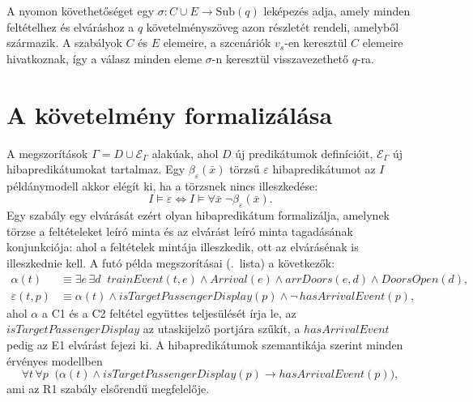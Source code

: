A nyomon követhetőséget egy $\sigma \colon C \cup E \to \mathrm{Sub}(q)$ leképezés adja, amely minden feltételhez és elváráshoz a $q$ követelményszöveg azon részletét rendeli, amelyből származik. A szabályok $C$ és $E$ elemeire, a szcenáriók $v_s$-en keresztül $C$ elemeire hivatkoznak, így a válasz minden eleme $\sigma$-n keresztül visszavezethető $q$-ra.


\section{A követelmény formalizálása}
\label{sec:impl-formalization}

A megszorítások $\Gamma = D \cup \mathcal{E}_\Gamma$ alakúak, ahol $D$ új predikátumok definícióit, $\mathcal{E}_\Gamma$ új hibapredikátumokat tartalmaz. Egy $\beta_\varepsilon(\bar{x})$ törzsű $\varepsilon$ hibapredikátumot az $I$ példánymodell akkor elégít ki, ha a törzsnek nincs illeszkedése:
\begin{equation}
I \models \varepsilon \iff I \models \forall \bar{x}\; \neg\beta_\varepsilon(\bar{x}). \label{eq:impl-error}
\end{equation}
Egy szabály egy elvárását ezért olyan hibapredikátum formalizálja, amelynek törzse a feltételeket leíró minta és az elvárást leíró minta tagadásának konjunkciója: ahol a feltételek mintája illeszkedik, ott az elvárásénak is illeszkednie kell. A futó példa megszorításai (.~lista) a következők:
\begin{align}
\alpha(t) &\equiv \exists e\, \exists d\;\; \mathit{trainEvent}(t,e) \land \mathit{Arrival}(e) \land \mathit{arrDoors}(e,d) \land \mathit{DoorsOpen}(d), \label{eq:impl-alpha}\\
\varepsilon(t,p) &\equiv \alpha(t) \land \mathit{isTargetPassengerDisplay}(p) \land \neg\, \mathit{hasArrivalEvent}(p), \label{eq:impl-eps}
\end{align}
ahol $\alpha$ a C1 és a C2 feltétel együttes teljesülését írja le, az $\mathit{isTargetPassengerDisplay}$ az utaskijelző portjára szűkít, a $\mathit{hasArrivalEvent}$ pedig az E1 elvárást fejezi ki. A hibapredikátumok szemantikája szerint minden érvényes modellben
\begin{equation}
\forall t\, \forall p\;\; \bigl(\alpha(t) \land \mathit{isTargetPassengerDisplay}(p) \rightarrow \mathit{hasArrivalEvent}(p)\bigr),
\end{equation}
ami az R1 szabály elsőrendű megfelelője.

